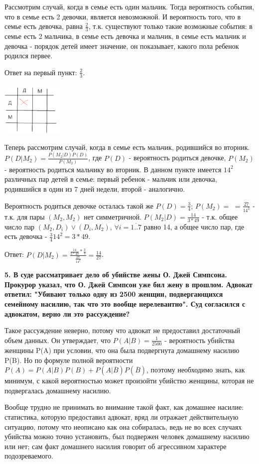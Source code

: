 \documentclass{article}
\begin{document}
Рассмотрим случай, когда в семье есть один мальчик. Тогда вероятность события, что в семье есть 2 девочки, является невозможной. И вероятность того, что в семье есть девочка, равна $\frac{2}{3}$, т.к. существуют только такие возможные события: в семье есть 2 мальчика, в семье есть девочка и мальчик, в семье есть мальчик и девочка - порядок детей имеет значение, он показывает, какого пола ребенок родился первее.

Ответ на первый пункт: $\frac{2}{3}$.

\includegraphics[width=30mm]{BoysAndGirls}

Теперь рассмотрим случай, когда в семье есть мальчик, родившийся во вторник. $P(D|M_2) = \frac{P(M_2|D)P(D)}{P(M_2)}$, где $P(D)$ - вероятность родиться девочке, $P(M_2)$ - вероятность родиться мальчику во вторник. В данном пункте имеется $14^2$ различных пар детей в семье: первый ребенок - мальчик или девочка, родившийся в один из 7 дней недели, второй - аналогично. 

Вероятность родиться девочке осталась такой же $P(D)= \frac{3}{4}$; $P(M_2) =$ $=\frac{27}{14^2}$ - т.к. для пары $(M_2,M_2)$ нет симметричной. $P(M_2|D) = \frac{14}{3*49}$ - т.к. общее число пар $(M_2,D_i) \lor (D_i, M_2)$, $\forall i = \overline{1..7}$ равно 14, а общее число пар, где есть девочка - $\frac{3}{4}14^2 = 3*49$.

\vspace{1mm}

Ответ: $P(D|M_2) = \frac{\frac{14}{3*49}*\frac{3}{4}}{\frac{27}{14^2}} = \frac{14}{27}$.

\vspace{2mm}

\noindent \textbf{5. В суде рассматривает дело об убийстве жены О. Джей Симпсона. Прокурор указал, что О. Джей Симпсон уже бил жену в прошлом. Адвокат ответил: "Убивают только одну из 2500 женщин, подвергающихся семейному насилию, так что это вообще нерелевантно". Суд согласился с адвокатом, верно ли это рассуждение?}

Такое рассуждение неверно, потому что адвокат не предоставил достаточный объем данных. Он утверждает, что $P(A|B)= \frac{1}{2500}$ - вероятность убийства женщины P(A) при условии, что она была подвергнута домашнему насилию P(B). Но по формуле полной вероятности $P(A) = P(A|B)P(B) + P(A|\overline B)P(\overline B)$, поэтому необходимо знать, как минимум, с какой вероятностью может произойти убийство женщины, которая не подвергалась домашнему насилию.

Вообще трудно не принимать во внимание такой факт, как домашнее насилие: статистика, которую предоставил адвокат, вряд ли отражает действительную ситуацию, потому что неописано как она собиралась, ведь не во всех случаях убийства можно точно установить, был подвержен человек домашнему насилию или нет; сам факт домашнего насилия говорит об агрессивном характере подозреваемого.
\end{document}
